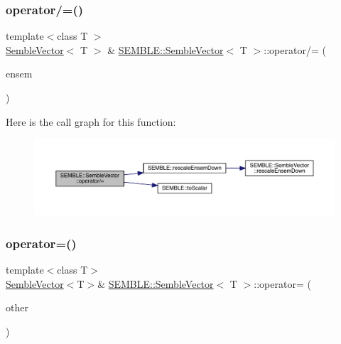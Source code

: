 \mbox{\label{structSEMBLE_1_1SembleVector_a9533ef56ccd7f84ae674b3ab1c378641}} 
\subsubsection{\texorpdfstring{operator/=()}{operator/=()}\hspace{0.1cm}{\footnotesize\ttfamily [6/6]}}
{\footnotesize\ttfamily template$<$class T $>$ \\
\mbox{\hyperlink{structSEMBLE_1_1SembleVector}{Semble\+Vector}}$<$ T $>$ \& \mbox{\hyperlink{structSEMBLE_1_1SembleVector}{S\+E\+M\+B\+L\+E\+::\+Semble\+Vector}}$<$ T $>$\+::operator/= (\begin{DoxyParamCaption}\item[{const typename \mbox{\hyperlink{structSEMBLE_1_1PromoteEnsem}{Promote\+Ensem}}$<$ T $>$\+::Type \&}]{ensem }\end{DoxyParamCaption})}

Here is the call graph for this function\+:
\nopagebreak
\begin{figure}[H]
\begin{center}
\leavevmode
\includegraphics[width=350pt]{d9/d94/structSEMBLE_1_1SembleVector_a9533ef56ccd7f84ae674b3ab1c378641_cgraph}
\end{center}
\end{figure}
\mbox{\label{structSEMBLE_1_1SembleVector_ae00dd483d5c7c42e0a174aff1df7b52e}} 
\subsubsection{\texorpdfstring{operator=()}{operator=()}\hspace{0.1cm}{\footnotesize\ttfamily [1/8]}}
{\footnotesize\ttfamily template$<$class T$>$ \\
\mbox{\hyperlink{structSEMBLE_1_1SembleVector}{Semble\+Vector}}$<$T$>$\& \mbox{\hyperlink{structSEMBLE_1_1SembleVector}{S\+E\+M\+B\+L\+E\+::\+Semble\+Vector}}$<$ T $>$\+::operator= (\begin{DoxyParamCaption}\item[{const \mbox{\hyperlink{structSEMBLE_1_1SembleVector}{Semble\+Vector}}$<$ T $>$ \&}]{other }\end{DoxyParamCaption})}

